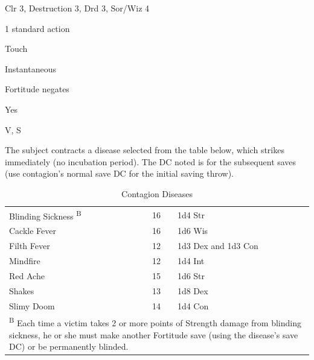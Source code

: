 
\begin{description*}
\item[Level:] Clr 3, Destruction 3, Drd 3, Sor/Wiz 4
\item[Casting Time:] 1 standard action
\item[Range:] Touch
\item[Duration:] Instantaneous
\item[Saving Throw:] Fortitude negates
\item[Spell Resistance:] Yes
\item[Components:] V, S
\end{description*}

The subject contracts a disease selected from the table below, which strikes immediately
(no incubation period). The DC noted is for the subsequent saves (use contagion's
normal save DC for the initial saving throw).
\begin{table}[htb]
\caption{Contagion Diseases}
\centering
\begin{tabular}{l c l}
Blinding Sickness \textsuperscript{B} & 16 & 1d4 Str\\
Cackle Fever & 16 & 1d6 Wis\\
Filth Fever & 12 & 1d3 Dex and 1d3 Con\\
Mindfire & 12 & 1d4 Int\\
Red Ache & 15 & 1d6 Str\\
Shakes & 13 & 1d8 Dex\\
Slimy Doom & 14 & 1d4 Con\\
\multicolumn{3}{p{7cm}}{\textsuperscript{B} Each time a victim takes 2 or more points of Strength damage from blinding sickness, he or she must make another Fortitude save (using the disease's save DC) or be permanently blinded.}\\
\end{tabular}
\end{table}